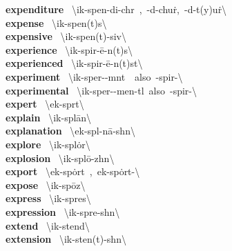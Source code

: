 \documentclass[10pt,a4paper]{article}
\begin{document}
\begin{multicols}{2}
\textbf{ expenditure }\quad \ \textbackslash ik-\textprimstress spen-di-ch\textschwa r\ ,\ -d\textschwa -\textsecstress chu\. r,\ -d\textschwa -\textsecstress t(y)u\. r\textbackslash \\
\textbf{ expense }\quad \ \textbackslash ik-\textprimstress spen(t)s\textbackslash \\
\textbf{ expensive }\quad \ \textbackslash ik-\textprimstress spen(t)-siv\textbackslash \\
\textbf{ experience }\quad \ \textbackslash ik-\textprimstress spir-\={e}-\textschwa n(t)s\textbackslash \\
\textbf{ experienced }\quad \ \textbackslash ik-\textprimstress spir-\={e}-\textschwa n(t)st\textbackslash \\
\textbf{ experiment }\quad \ \textbackslash ik-\textprimstress sper-\textschwa -m\textschwa nt\ \ also\ -\textprimstress spir-\textbackslash \\
\textbf{ experimental }\quad \ \textbackslash ik-\textsecstress sper-\textschwa -\textprimstress men-t\textsuperscript{\textreve}l\ also\ -\textsecstress spir-\textbackslash \\
\textbf{ expert }\quad \ \textbackslash \textprimstress ek-\textsecstress sp\textschwa rt\textbackslash \\
\textbf{ explain }\quad \ \textbackslash ik-\textprimstress spl\={a}n\textbackslash \\
\textbf{ explanation }\quad \ \textbackslash \textsecstress ek-spl\textschwa -\textprimstress n\={a}-sh\textschwa n\textbackslash \\
\textbf{ explore }\quad \ \textbackslash ik-\textprimstress spl\.{o}r\textbackslash \\
\textbf{ explosion }\quad \ \textbackslash ik-\textprimstress spl\={o}-zh\textschwa n\textbackslash \\
\textbf{ export }\quad \ \textbackslash ek-\textprimstress sp\.{o}rt\ ,\ \textprimstress ek-\textsecstress sp\.{o}rt-\textbackslash \\
\textbf{ expose }\quad \ \textbackslash ik-\textprimstress sp\={o}z\textbackslash \\
\textbf{ express }\quad \ \textbackslash ik-\textprimstress spres\textbackslash \\
\textbf{ expression }\quad \ \textbackslash ik-\textprimstress spre-sh\textschwa n\textbackslash \\
\textbf{ extend }\quad \ \textbackslash ik-\textprimstress stend\textbackslash \\
\textbf{ extension }\quad \ \textbackslash ik-\textprimstress sten(t)-sh\textschwa n\textbackslash \\

\end{multicols}
\end{document}
